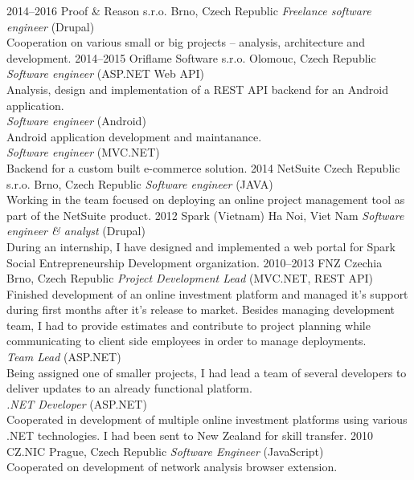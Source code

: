 \documentclass[]{friggeri-cv} %
\begin{document}
\begin{entrylist}
\entry
{2014--2016}
{Proof \& Reason s.r.o.}
{Brno, Czech Republic}
{\emph{Freelance software engineer} (Drupal) \\
Cooperation on various small or big projects -- analysis, architecture and development. \medskip
}
\entry
{2014--2015}
{Oriflame Software s.r.o.}
{Olomouc, Czech Republic}
{\emph{Software engineer} (ASP.NET Web API) \\ 
Analysis, design and implementation of a REST API backend for an Android application. \smallskip\\
\emph{Software engineer} (Android) \\ 
Android application development and maintanance. \smallskip\\
\emph{Software engineer} (MVC.NET) \\
Backend for a custom built e-commerce solution. \medskip
}
\entry
{2014}
{NetSuite Czech Republic s.r.o.}
{Brno, Czech Republic}
{\emph{Software engineer} (JAVA)\\
Working in the team focused on deploying an online project management tool as part of the NetSuite product. \medskip
}
\entry
{2012}
{Spark (Vietnam)}
{Ha Noi, Viet Nam}
{\emph{Software engineer \& analyst} (Drupal) \\
During an internship, I have designed and implemented a web portal for Spark Social Entrepreneurship Development organization. \medskip
}
\entry
{2010--2013}
{FNZ Czechia}
{Brno, Czech Republic}
{\emph{Project Development Lead} (MVC.NET, REST API) \\
Finished development of an online investment platform and managed it's support during first months after it's release to market. Besides managing development team, I had to provide estimates and contribute to project planning while communicating to client side employees in order to manage deployments. \smallskip\\
\emph{Team Lead} (ASP.NET) \\
Being assigned one of smaller projects, I had lead a team of several developers to deliver updates to an already functional platform. \smallskip\\
\emph{.NET Developer} (ASP.NET) \\
Cooperated in development of multiple online investment platforms using various .NET technologies. I had been sent to New Zealand for skill transfer. \medskip
}
\entry
{2010}
{CZ.NIC}
{Prague, Czech Republic}
{\emph{Software Engineer} (JavaScript) \\
Cooperated on development of network analysis browser extension.}
\end{entrylist}
\end{document}
